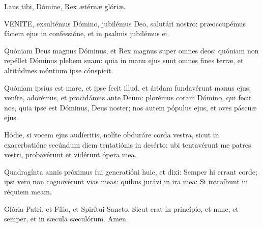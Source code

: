 
Laus tibi, Dómine, Rex ætérnæ glóriæ.



\lettrine[lines=2]{V}{ENITE}, exsultémus Dómino, jubilémus Deo, salutári nostro: præoccupémus fáciem ejus in confessióne, et in psalmis jubilémus ei.


Quóniam Deus magnus Dóminus, et Rex magnus super omnes deos: quóniam non repéllet Dóminus plebem suam: quia in manu ejus sunt omnes fines terræ, et altitúdines móntium ipse cónspicit.



Quóniam ipsíus est mare, et ipse fecit illud, et áridam fundavérunt manus ejus: veníte, adorémus, et procidámus ante Deum: plorémus coram Dómino, qui fecit nos, quia ipse est Dóminus, Deus noster; nos autem pópulus ejus, et oves páscuæ ejus.


Hódie, si vocem ejus audíeritis, nolíte obduráre corda vestra, sicut in exacerbatióne secúndum diem tentatiónis in desérto: ubi tentavérunt me patres vestri, probavérunt et vidérunt ópera mea.


Quadragínta annis próximus fui generatióni huic, et dixi: Semper hi errant corde; ipsi vero non cognovérunt vias meas: quibus jurávi in ira mea: Si introíbunt in réquiem meam.


Glória Patri, et Fílio, et Spirítui Sancto. Sicut erat in princípio, et nunc, et semper, et in sæcula sæculórum. Amen.



